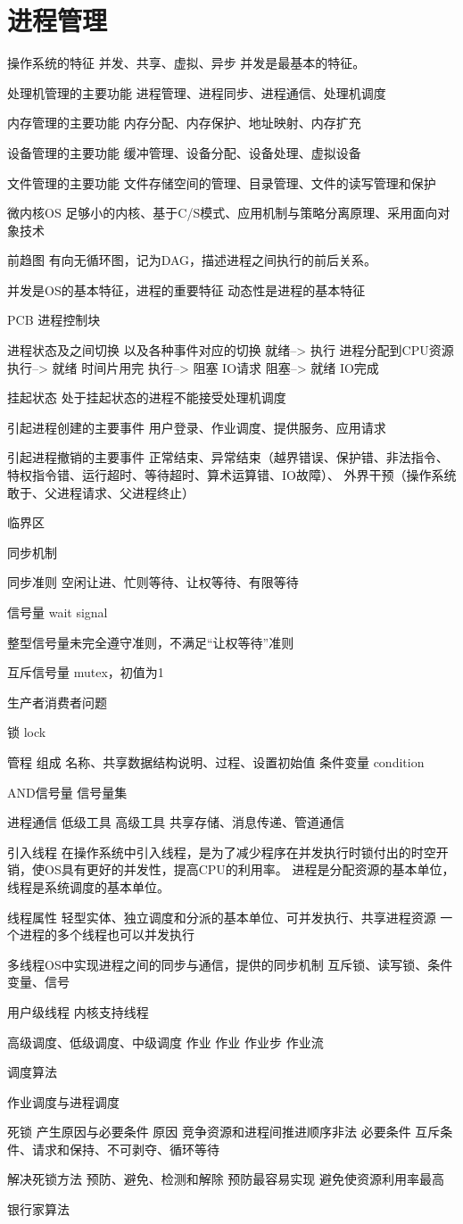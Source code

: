 \chapter{进程管理}

操作系统的特征
并发、共享、虚拟、异步
并发是最基本的特征。

处理机管理的主要功能
进程管理、进程同步、进程通信、处理机调度

内存管理的主要功能
内存分配、内存保护、地址映射、内存扩充

设备管理的主要功能
缓冲管理、设备分配、设备处理、虚拟设备

文件管理的主要功能
文件存储空间的管理、目录管理、文件的读写管理和保护

微内核OS
足够小的内核、基于C/S模式、应用机制与策略分离原理、采用面向对象技术

前趋图
有向无循环图，记为DAG，描述进程之间执行的前后关系。

并发是OS的基本特征，进程的重要特征
动态性是进程的基本特征

PCB 进程控制块

进程状态及之间切换
以及各种事件对应的切换
就绪--> 执行 进程分配到CPU资源
执行--> 就绪 时间片用完
执行--> 阻塞 IO请求
阻塞--> 就绪 IO完成

挂起状态
处于挂起状态的进程不能接受处理机调度

引起进程创建的主要事件
用户登录、作业调度、提供服务、应用请求

引起进程撤销的主要事件
正常结束、异常结束（越界错误、保护错、非法指令、
特权指令错、运行超时、等待超时、算术运算错、IO故障）、
外界干预（操作系统敢于、父进程请求、父进程终止）

临界区

同步机制

同步准则
空闲让进、忙则等待、让权等待、有限等待

信号量 wait signal

整型信号量未完全遵守准则，不满足“让权等待”准则

互斥信号量 mutex，初值为1 
 

生产者消费者问题

锁 lock

管程
组成 名称、共享数据结构说明、过程、设置初始值
条件变量 condition 

AND信号量
信号量集

进程通信
低级工具 
高级工具 共享存储、消息传递、管道通信


引入线程
在操作系统中引入线程，是为了减少程序在并发执行时锁付出的时空开销，使OS具有更好的并发性，提高CPU的利用率。
进程是分配资源的基本单位，线程是系统调度的基本单位。

线程属性
轻型实体、独立调度和分派的基本单位、可并发执行、共享进程资源
一个进程的多个线程也可以并发执行



多线程OS中实现进程之间的同步与通信，提供的同步机制
互斥锁、读写锁、条件变量、信号

用户级线程
内核支持线程

高级调度、低级调度、中级调度
作业
作业 作业步 作业流

调度算法

作业调度与进程调度

死锁
产生原因与必要条件
原因 竞争资源和进程间推进顺序非法
必要条件 互斥条件、请求和保持、不可剥夺、循环等待

解决死锁方法
预防、避免、检测和解除
预防最容易实现
避免使资源利用率最高

银行家算法




